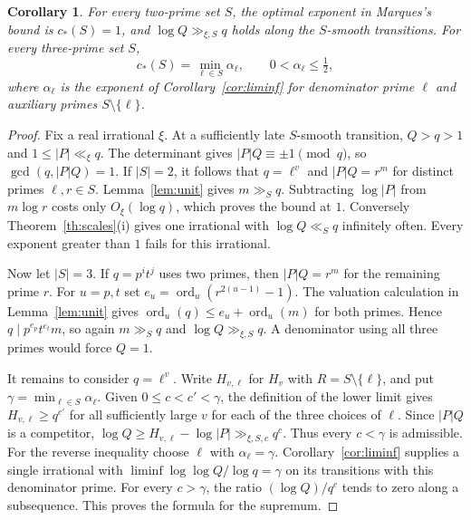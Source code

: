 \documentclass[11pt]{article}
\newtheorem{corollary}[theorem]{Corollary}
\begin{document}
\begin{corollary}\label{cor:support}
For every two-prime set $S$, the optimal exponent in Marques's bound is
$c_*(S)=1$, and $\log Q\gg_{\xi,S}q$ holds along the $S$-smooth
transitions. For every three-prime set $S$,
\[
            c_*(S)=\min_{\ell\in S}\alpha_\ell,\qquad
            0<\alpha_\ell\le\tfrac12,
\]
where $\alpha_\ell$ is the exponent of Corollary~\ref{cor:liminf}
for denominator prime $\ell$ and auxiliary primes $S\setminus\{\ell\}$.
\end{corollary}
\begin{proof}
Fix a real irrational $\xi$. At a sufficiently late $S$-smooth
transition, $Q>q>1$ and $1\le |P|\ll_\xi q$. The determinant gives
$|P|Q\equiv\pm1\pmod q$, so $\gcd(q,|P|Q)=1$. If $|S|=2$, it follows
that $q=\ell^v$ and $|P|Q=r^m$ for distinct primes $\ell,r\in S$.
Lemma~\ref{lem:unit} gives $m\gg_S q$. Subtracting $\log |P|$ from
$m\log r$ costs only $O_\xi(\log q)$, which proves the bound at $1$.
Conversely Theorem~\ref{th:scales}(i) gives one irrational with
$\log Q\ll_S q$ infinitely often. Every exponent greater than $1$ fails
for this irrational.

Now let $|S|=3$. If $q=p^it^j$ uses two primes, then $|P|Q=r^m$ for
the remaining prime $r$. For $u=p,t$ set
$e_u=\operatorname{ord}_u(r^{2(u-1)}-1)$. The valuation calculation in
Lemma~\ref{lem:unit} gives
$\operatorname{ord}_u(q)\le e_u+\operatorname{ord}_u(m)$ for both
primes. Hence $q\mid p^{e_p}t^{e_t}m$, so again $m\gg_S q$ and
$\log Q\gg_{\xi,S}q$. A denominator using all three primes would force
$Q=1$.

It remains to consider $q=\ell^v$. Write $H_{v,\ell}$ for $H_v$ with
$R=S\setminus\{\ell\}$, and put $\gamma=\min_{\ell\in S}\alpha_\ell$.
Given $0\le c<c'<\gamma$, the definition of the lower limit gives
$H_{v,\ell}\ge q^{c'}$ for all sufficiently large $v$ for each of the
three choices of $\ell$. Since $|P|Q$ is a competitor,
$\log Q\ge H_{v,\ell}-\log |P|\gg_{\xi,S,c}q^c$. Thus every
$c<\gamma$ is admissible. For the reverse inequality choose $\ell$ with
$\alpha_\ell=\gamma$. Corollary~\ref{cor:liminf} supplies a single
irrational with $\liminf\log\log Q/\log q=\gamma$ on its transitions
with this denominator prime. For every $c>\gamma$, the ratio
$(\log Q)/q^c$ tends to zero along a subsequence. This proves the
formula for the supremum.
\end{proof}
\end{document}
